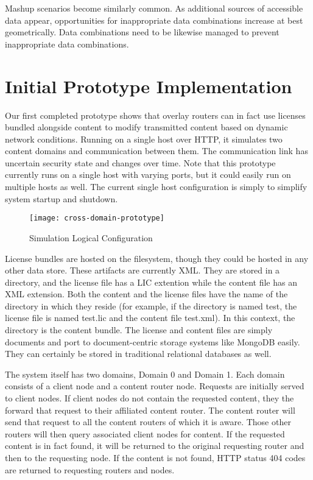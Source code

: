 Mashup scenarios become similarly common.  As additional sources of accessible data appear, opportunities for inappropriate data combinations increase at best geometrically.  Data combinations need to be likewise managed to prevent inappropriate data combinations.

\section{Initial Prototype Implementation}
Our first completed prototype shows that overlay routers can in fact use licenses bundled alongside content to modify transmitted content based on dynamic network conditions.  Running on a single host over HTTP, it simulates two content domains and communication between them.  The communication link has uncertain security state and changes over time.  Note that this prototype currently runs on a single host with varying ports, but it could easily run on multiple hosts as well.  The current single host configuration is simply to simplify system startup and shutdown.

\begin{figure*}[!t]
\centering
\texttt{[image: cross-domain-prototype]}
\caption{Simulation Logical Configuration}
\label{fig:model:cross-domain-prototype}
\end{figure*}

License bundles are hosted on the filesystem, though they could be hosted in any other data store.  These artifacts are currently XML.  They are stored in a directory, and the license file has a LIC extention while the content file has an XML extension.  Both the content and the license files have the name of the directory in which they reside (for example, if the directory is named test, the license file is named test.lic and the content file test.xml).  In this context, the directory is the content bundle.  The license and content files are simply documents and port to document-centric storage systems like MongoDB easily.  They can certainly be stored in traditional relational databases as well.

The system itself has two domains, Domain 0 and Domain 1.  Each domain consists of a client node and a content router node.  Requests are initially served to client nodes.  If client nodes do not contain the requested content, they the forward that request to their affiliated content router.  The content router will send that request to all the content routers of which it is aware.  Those other routers will then query associated client nodes for content.  If the requested content is in fact found, it will be returned to the original requesting router and then to the requesting node.  If the content is not found, HTTP status 404 codes are returned to requesting routers and nodes.

